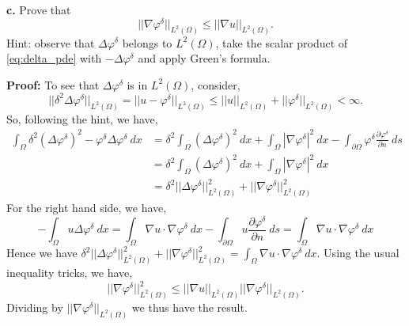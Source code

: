 \documentclass[11pt]{article}
\begin{document}
\vskip 2cm


\textbf{c.} Prove that
\begin{equation}
    ||\nabla \varphi^\delta||_{L^2(\Omega)} \leq ||\nabla u ||_{L^2(\Omega)}.
\end{equation}
Hint: observe that $\Delta \varphi^\delta$ belongs to $L^2(\Omega)$, take the scalar product of \eqref{eq:delta_pde} with $-\Delta \varphi^\delta$ and apply Green's formula.

\vskip 1cm


\textbf{Proof:} To see that $\Delta \varphi^\delta$ is in $L^2(\Omega)$, consider,
\begin{equation*}
    ||\delta^2\Delta \varphi^\delta||_{L^2(\Omega)} = ||u - \varphi^\delta||_{L^2(\Omega)} \leq ||u||_{L^2(\Omega)} + ||\varphi^\delta||_{L^2(\Omega)} < \infty.
\end{equation*}
So, following the hint, we have,
\begin{align*}
    \int_\Omega \delta^2 (\Delta \varphi^\delta)^2 - \varphi^\delta \Delta\varphi^\delta \: dx &= \delta^2 \int_\Omega (\Delta \varphi^\delta )^2 \: dx + \int_\Omega |\nabla \varphi^\delta|^2 \: dx - \int_{\partial\Omega} \varphi^\delta \frac{\partial \varphi^\delta}{\partial n} \: ds \\
    &= \delta^2 \int_\Omega (\Delta \varphi^\delta )^2 \: dx + \int_\Omega |\nabla \varphi^\delta|^2 \: dx \\
    &= \delta^2 ||\Delta \varphi^\delta||^2_{L^2(\Omega)} + ||\nabla \varphi^\delta||^2_{L^2(\Omega)}
\end{align*}
For the right hand side, we have,
\begin{equation*}
    -\int_\Omega u \Delta \varphi^\delta \: dx = \int_\Omega \nabla u \cdot \nabla \varphi^\delta \: dx - \int_{\partial \Omega} u \frac{\partial \varphi^\delta}{\partial n} \: ds = \int_\Omega \nabla u \cdot \nabla \varphi^\delta \: dx
\end{equation*}
Hence we have $\delta^2 ||\Delta \varphi^\delta||^2_{L^2(\Omega)} + ||\nabla \varphi^\delta||^2_{L^2(\Omega)} = \int_\Omega \nabla u \cdot \nabla \varphi^\delta \: dx$.
Using the usual inequality tricks, we have,
\begin{equation*}
    ||\nabla \varphi^\delta||^2_{L^2(\Omega)} \leq ||\nabla u||_{L^2(\Omega)} ||\nabla \varphi^\delta||_{L^2(\Omega)}.
\end{equation*}
Dividing by $||\nabla \varphi^\delta||_{L^2(\Omega)}$ we thus have the result.


\vskip 2cm 
\end{document}
